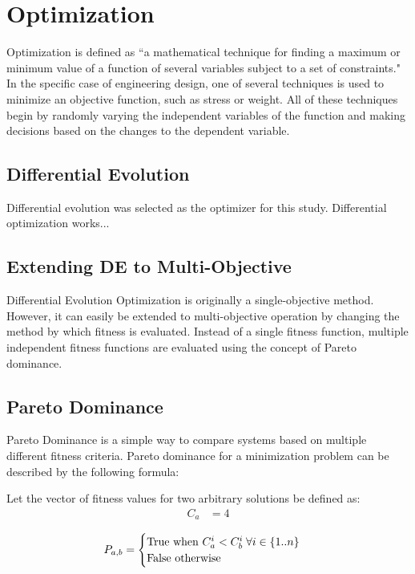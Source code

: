 \section{Optimization}
Optimization is defined as ``a mathematical technique for finding a maximum or minimum value of a function of several variables subject to a set of constraints."\cite{opt-def} In the specific case of engineering design, one of several techniques is used to minimize an objective function, such as stress or weight. All of these techniques begin by randomly varying the independent variables of the function and making decisions based on the changes to the dependent variable.

\subsection{Differential Evolution}
Differential evolution was selected as the optimizer for this study. Differential optimization works...

\subsection{Extending DE to Multi-Objective}
Differential Evolution Optimization is originally a single-objective method. However, it can easily be extended to multi-objective operation by changing the method by which fitness is evaluated. Instead of a single fitness function, multiple independent fitness functions are evaluated using the concept of Pareto dominance. 

\subsection{Pareto Dominance}
Pareto Dominance is a simple way to compare systems based on multiple different fitness criteria. Pareto dominance for a minimization problem can be described by the following formula: 

Let the vector of fitness values for two arbitrary solutions be defined as:
\begin{align*}
C_a &= 4
\end{align*}

$$
P_{a,b} = \begin{cases}
          \hbox{True  when  } C_{a}^i < C_{b}^i \; \forall i \in \{1..n\}\\ 
          \hbox{False otherwise}
          \end{cases}
$$
